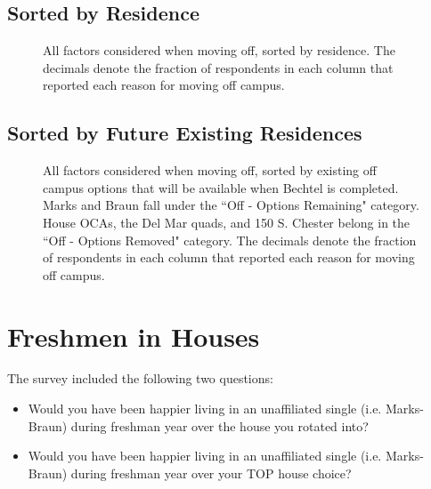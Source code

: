 \documentclass[12pt]{article} %
\begin{document}
\subsection{Sorted by Residence}

\begin{figure}[H]
	\caption{All factors considered when moving off, sorted by residence. The decimals denote the fraction of respondents in each column that reported each reason for moving off campus.}

\end{figure}

\subsection{Sorted by Future Existing Residences}

\vspace{5 mm}
\begin{figure}[H]
	\vspace{5mm}
	\caption{All factors considered when moving off, sorted by existing off campus options that will be available when Bechtel is completed. Marks and Braun fall under the ``Off - Options Remaining" category. House OCAs,  the Del Mar quads, and 150 S. Chester belong in the ``Off - Options Removed" category. The decimals denote the fraction of respondents in each column that reported each reason for moving off campus.}

\end{figure}
\newpage
\section{Freshmen in Houses}

The survey included the following two questions:
\vspace{-4mm}
\begin{itemize}
\item Would you have been happier living in an unaffiliated single (i.e. Marks-Braun) during freshman year over the house you rotated into? 
\vspace{-2mm}
\item Would you have been happier living in an unaffiliated single (i.e. Marks-Braun) during freshman year over 	your TOP house choice?
\end{itemize}
\vspace{-4mm}
\end{document}
